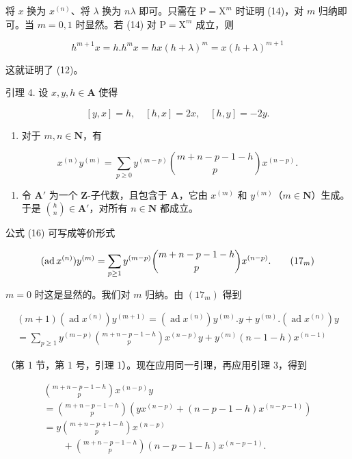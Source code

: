 将 \(x\) 换为 \(x^{(n)}\)、将 \(\lambda\) 换为 \(n\lambda\) 即可。只需在 \(\mathrm{P} = \mathrm{X}^m\) 时证明 (14)，对 \(m\) 归纳即可。当 \(m = 0, 1\) 时显然。若 (14) 对 \(\mathrm{P} = \mathrm{X}^m\) 成立，则

\[
h ^ {m + 1} x = h. h ^ {m} x = h x (h + \lambda) ^ {m} = x (h + \lambda) ^ {m + 1}
\]

这就证明了 (12)。

引理 4. 设 \(x, y, h \in \mathbf{A}\) 使得

\[
[ y, x ] = h, \quad [ h, x ] = 2 x, \quad [ h, y ] = - 2 y.\tag{15}
\]

\begin{enumerate}
\def\labelenumi{(\roman{enumi})}
\tightlist
\item
  对于 \(m, n \in \mathbf{N}\)，有
\end{enumerate}

\[
x ^ {(n)} y ^ {(m)} = \sum_ {p \geq 0} y ^ {(m - p)} \binom{m + n - p - 1 - h}{p} x ^ {(n - p)}.\tag{16}
\]

\begin{enumerate}
\def\labelenumi{(\roman{enumi})}
\setcounter{enumi}{1}
\tightlist
\item
  令 \(\mathbf{A}'\) 为一个 \(\mathbf{Z}\)-子代数，且包含于 \(\mathbf{A}\)，它由 \(x^{(m)}\) 和 \(y^{(m)}\)（\(m \in \mathbf{N}\)）生成。于是 \(\binom{h}{n} \in \mathbf{A}'\)，对所有 \(n \in \mathbf{N}\) 都成立。
\end{enumerate}

公式 (16) 可写成等价形式

\[
(\operatorname{ad} x ^ {(n)}) y ^ {(m)} = \sum_ {p \geq 1} y ^ {(m - p)} \binom {m + n - p - 1 - h} {p} x ^ {(n - p)}.\tag{$17_{m}$}
\]

\(m = 0\) 时这是显然的。我们对 \(m\) 归纳。由 \((17_{m})\) 得到

\[
\begin{array}{l} (m + 1) (\operatorname{ad} x ^ {(n)}) y ^ {(m + 1)} = (\operatorname{ad} x ^ {(n)}) y ^ {(m)}. y + y ^ {(m)}. (\operatorname{ad} x ^ {(n)}) y \\ = \sum_ {p \geq 1} y ^ {(m - p)} \binom {m + n - p - 1 - h} {p} x ^ {(n - p)} y + y ^ {(m)} (n - 1 - h) x ^ {(n - 1)} \end{array} \tag {18}
\]

（第 1 节，第 1 号，引理 1）。现在应用同一引理，再应用引理 3，得到

\[
\begin{array}{l} \binom {m + n - p - 1 - h} {p} x ^ {(n - p)} y \\ = \binom {m + n - p - 1 - h} {p} (y x ^ {(n - p)} + (n - p - 1 - h) x ^ {(n - p - 1)}) \\ = y \binom {m + n - p + 1 - h} {p} x ^ {(n - p)} \\ \qquad + \binom {m + n - p - 1 - h} {p} (n - p - 1 - h) x ^ {(n - p - 1)}. \end{array}
\]

